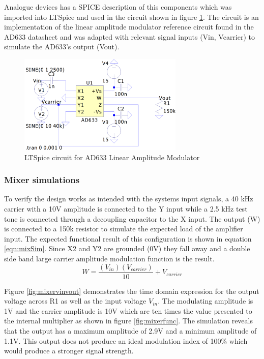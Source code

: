 Analogue devices has a SPICE description of this components which was imported into LTSpice and used in the circuit shown in figure \ref{fig:amCirc}. The circuit is an implementation of the linear amplitude modulator reference circuit found in the AD633 datasheet and was adapted with relevant signal inputs (Vin, Vcarrier) to simulate the AD633's output (Vout).

\begin{figure}[ht!]
    \centering
    \includegraphics[width=0.7\textwidth]{Figures/Design/Mixer/ad633mixer.png}
    \caption{LTSpice circuit for AD633 Linear Amplitude Modulator}
    \label{fig:amCirc}
\end{figure}

\subsubsection{Mixer simulations}
To verify the design works as intended with the systems input signals, a 40 kHz carrier with a 10V amplitude is connected to the Y input while a 2.5 kHz test tone is connected through a decoupling capacitor to the X input. The output (W) is connected to a 150k resistor to simulate the expected load of the amplifier input. The expected functional result of this configuration is shown in equation \ref{eqn:mixSim}. Since X2 and Y2 are grounded (0V) they fall away and a double side band large carrier amplitude modulation function is the result.
\begin{equation}\label{eqn:mixSim}
    W = \frac{(V_{in})(V_{carrier})}{10} + V_{carrier}
\end{equation}

Figure \ref{fig:mixervinvout} demonstrates the time domain expression for the output voltage across R1 as well as the input voltage $V_{in}$. The modulating amplitude is 1V and the carrier amplitude is 10V which are ten times the value presented to the internal multiplier as shown in figure \ref{fig:mixerfunc}. The simulation reveals that the output has a maximum amplitude of 2.9V and a minimum amplitude of 1.1V. This output does not produce an ideal modulation index of 100\% which would produce a stronger signal strength.

